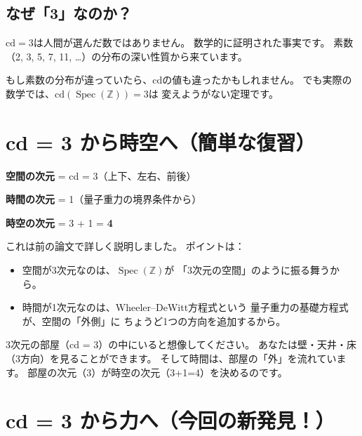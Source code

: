 \documentclass[12pt,a4paper]{article}
\newcommand{\Spec}{\operatorname{Spec}}
\begin{document}
\subsection{なぜ「3」なのか？}

$\mathrm{cd} = 3$は人間が選んだ数ではありません。
数学的に証明された事実です。
素数（2, 3, 5, 7, 11, \ldots）の分布の深い性質から来ています。

もし素数の分布が違っていたら、cdの値も違ったかもしれません。
でも実際の数学では、$\mathrm{cd}(\Spec(\mathbb{Z})) = 3$は
変えようがない定理です。

\section{cd = 3 から時空へ（簡単な復習）}

\begin{keyidea}[空間3次元 + 時間1次元 = 4次元時空]
\begin{center}
\textbf{空間の次元} = cd = 3（上下、左右、前後）

\textbf{時間の次元} = 1（量子重力の境界条件から）

\textbf{時空の次元} = 3 + 1 = \textbf{4}
\end{center}
\end{keyidea}

これは前の論文で詳しく説明しました。
ポイントは：
\begin{itemize}
  \item 空間が3次元なのは、$\Spec(\mathbb{Z})$が
    「3次元の空間」のように振る舞うから。
  \item 時間が1次元なのは、Wheeler--DeWitt方程式という
    量子重力の基礎方程式が、空間の「外側」に
    ちょうど1つの方向を追加するから。
\end{itemize}

\begin{analogy}[部屋のアナロジー]
3次元の部屋（cd = 3）の中にいると想像してください。
あなたは壁・天井・床（3方向）を見ることができます。
そして時間は、部屋の「外」を流れています。
部屋の次元（3）が時空の次元（3+1=4）を決めるのです。
\end{analogy}

\section{cd = 3 から力へ（今回の新発見！）}
\end{document}
